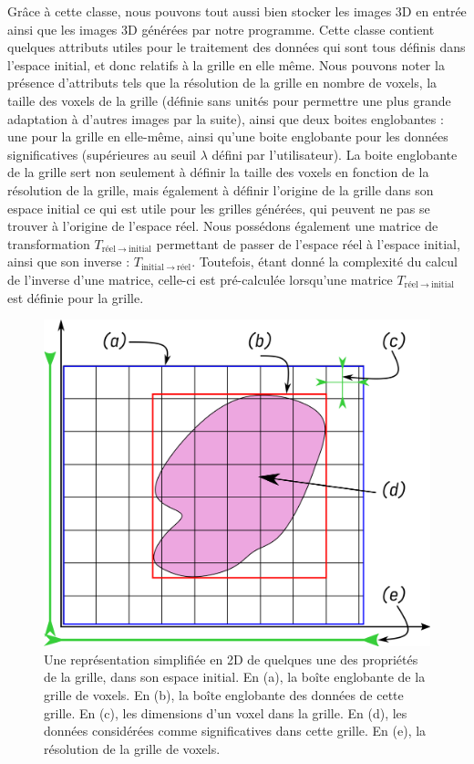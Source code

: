 {{{            Grâce à cette classe, nous pouvons tout aussi bien stocker les images 3D en entrée ainsi que les images 3D générées par notre programme. Cette classe contient quelques attributs utiles pour le traitement des données qui sont tous définis dans l'espace initial, et donc relatifs à la grille en elle même. Nous pouvons noter la présence d'attributs tels que la résolution de la grille en nombre de voxels, la taille des voxels de la grille (définie sans unités pour permettre une plus grande adaptation à d'autres images par la suite), ainsi que deux boites englobantes : une pour la grille en elle-même, ainsi qu'une boite englobante pour les données significatives (supérieures au seuil $\lambda$  défini par l'utilisateur). La boite englobante de la grille sert non seulement à définir la taille des voxels en fonction de la résolution de la grille, mais également à définir l'origine de la grille dans son espace initial ce qui est utile pour les grilles générées, qui peuvent ne pas se trouver à l'origine de l'espace réel. Nous possédons également une matrice de transformation $T_{\text{réel}~\rightarrow~\text{initial}}$ permettant de passer de l'espace réel à l'espace initial, ainsi que son inverse : $T_{\text{initial}~\rightarrow~\text{réel}}$. Toutefois, étant donné la complexité du calcul de l'inverse d'une matrice, celle-ci est pré-calculée lorsqu'une matrice $T_{\text{réel}~\rightarrow~\text{initial}}$ est définie pour la grille.

            \begin{figure}[h]
                \centering
                \includegraphics[width=.8\linewidth]{img/grid_properties_initial_space.png}
                \captionsetup{width=.8\linewidth}
                \caption{Une représentation simplifiée en 2D de quelques une des propriétés de la grille, dans son espace initial. En (a), la boîte englobante de la grille de voxels. En (b), la boîte englobante des données de cette grille. En (c), les dimensions d'un voxel dans la grille. En (d), les données considérées comme significatives dans cette grille. En (e), la résolution de la grille de voxels.}
                \label{img:grid_properties_initial_space}
            \end{figure}

}}}
